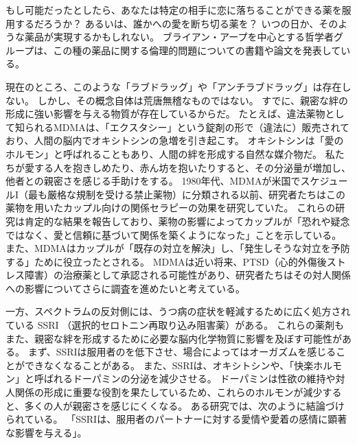 \documentclass[paper=a4,book,openany]{jlreq}
\begin{document}
もし可能だったとしたら、あなたは特定の相手に恋に落ちることができる薬を服用するだろうか？ あるいは、誰かへの愛を断ち切る薬を？ いつの日か、そのような薬品が実現するかもしれない。
ブライアン・アープを中心とする哲学者グループは、この種の薬品に関する倫理的問題についての書籍や論文を発表している。

現在のところ、このような「ラブドラッグ」や「アンチラブドラッグ」は存在しない。
しかし、その概念自体は荒唐無稽なものではない。
すでに、親密な絆の形成に強い影響を与える物質が存在しているからだ。
たとえば、違法薬物として知られるMDMAは、「エクスタシー」という錠剤の形で（違法に）販売されており、人間の脳内でオキシトシンの急増を引き起こす。
オキシトシンは「愛のホルモン」と呼ばれることもあり、人間の絆を形成する自然な媒介物だ。
私たちが愛する人を抱きしめたり、赤ん坊を抱いたりすると、その分泌量が増加し、他者との親密さを感じる手助けをする。
1980年代、MDMAが米国でスケジュールI（最も厳格な規制を受ける禁止薬物）に分類される以前、研究者たちはこの薬物を用いたカップル向けの関係セラピーの効果を研究していた。
これらの研究は肯定的な結果を報告しており、薬物の影響によってカップルが「恐れや疑念ではなく、愛と信頼に基づいて関係を築くようになった」ことを示している。
また、MDMAはカップルが「既存の対立を解決」し、「発生しそうな対立を予防する」ために役立ったとされる\citep[p.378]{greer98:_method_conduc_therap_session_mdma}。
MDMAは近い将来、PTSD（心的外傷後ストレス障害）の治療薬として承認される可能性があり、研究者たちはその対人関係への影響についてさらに調査を進めたいと考えている。

一方、スペクトラムの反対側には、うつ病の症状を軽減するために広く処方されている SSRI （選択的セロトニン再取り込み阻害薬）がある。
これらの薬剤もまた、親密な絆を形成するために必要な脳内化学物質に影響を及ぼす可能性がある。
まず、SSRIは服用者のを低下させ、場合によってはオーガズムを感じることができなくなることがある。
また、SSRIは、オキシトシンや、「快楽ホルモン」と呼ばれるドーパミンの分泌を減少させる。
ドーパミンは性欲の維持や対人関係の形成に重要な役割を果たしているため、これらのホルモンが減少すると、多くの人が親密さを感じにくくなる。
ある研究では、次のように結論づけられている。
「SSRIは、服用者のパートナーに対する愛情や愛着の感情に顕著な影響を与える」\citep{marazzitia14:_dimor_chang_some_featur_lovin}。
\end{document}
